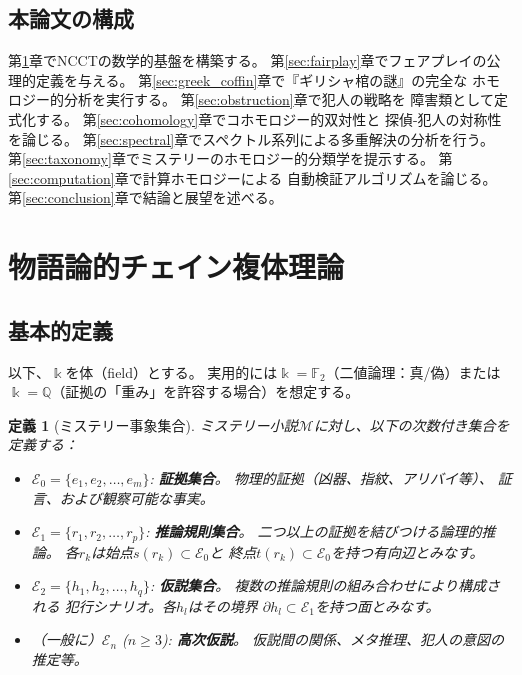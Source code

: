 \documentclass[12pt,twocolumn]{ltjsarticle}
\newtheorem{definition}[theorem]{定義}
\newcommand{\Q}{\mathbb{Q}}
\newcommand{\F}{\mathbb{F}}
\newcommand{\Ev}{\mathcal{E}}
\newcommand{\Mys}{\mathcal{M}}
\newcommand{\kk}{\Bbbk}
\begin{document}
\subsection{本論文の構成}

第\ref{sec:framework}章でNCCTの数学的基盤を構築する。
第\ref{sec:fairplay}章でフェアプレイの公理的定義を与える。
第\ref{sec:greek_coffin}章で『ギリシャ棺の謎』の完全な
ホモロジー的分析を実行する。
第\ref{sec:obstruction}章で犯人の戦略を
障害類として定式化する。
第\ref{sec:cohomology}章でコホモロジー的双対性と
探偵-犯人の対称性を論じる。
第\ref{sec:spectral}章でスペクトル系列による多重解決の分析を行う。
第\ref{sec:taxonomy}章でミステリーのホモロジー的分類学を提示する。
第\ref{sec:computation}章で計算ホモロジーによる
自動検証アルゴリズムを論じる。
第\ref{sec:conclusion}章で結論と展望を述べる。


\section{物語論的チェイン複体理論}
\label{sec:framework}

\subsection{基本的定義}

以下、$\kk$を体（field）とする。
実用的には$\kk = \F_2$（二値論理：真/偽）または
$\kk = \Q$（証拠の「重み」を許容する場合）を想定する。

\begin{definition}[ミステリー事象集合]
\label{def:mystery_events}
ミステリー小説$\Mys$に対し、以下の次数付き集合を定義する：
\begin{itemize}
\item $\Ev_0 = \{e_1, e_2, \ldots, e_m\}$: \textbf{証拠集合}。
  物理的証拠（凶器、指紋、アリバイ等）、
  証言、および観察可能な事実。

\item $\Ev_1 = \{r_1, r_2, \ldots, r_p\}$: \textbf{推論規則集合}。
  二つ以上の証拠を結びつける論理的推論。
  各$r_k$は始点$s(r_k) \subset \Ev_0$と
  終点$t(r_k) \subset \Ev_0$を持つ有向辺とみなす。

\item $\Ev_2 = \{h_1, h_2, \ldots, h_q\}$: \textbf{仮説集合}。
  複数の推論規則の組み合わせにより構成される
  犯行シナリオ。各$h_l$はその境界
  $\partial h_l \subset \Ev_1$を持つ面とみなす。

\item （一般に）$\Ev_n$ ($n \geq 3$): \textbf{高次仮説}。
  仮説間の関係、メタ推理、犯人の意図の推定等。
\end{itemize}
\end{definition}
\end{document}
